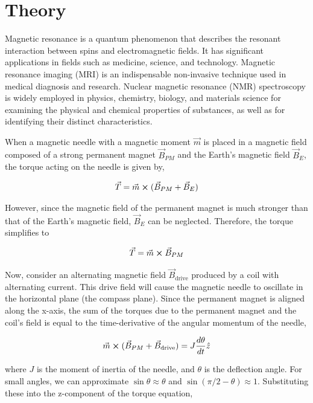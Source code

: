 \section{Theory}

Magnetic resonance is a quantum phenomenon that describes the resonant interaction between spins and electromagnetic fields. It has significant applications in fields such as medicine, science, and technology. Magnetic resonance imaging (MRI) is an indispensable non-invasive technique used in medical diagnosis and research. Nuclear magnetic resonance (NMR) spectroscopy is widely employed in physics, chemistry, biology, and materials science for examining the physical and chemical properties of substances, as well as for identifying their distinct characteristics.

When a magnetic needle with a magnetic moment
$\vec{m}$ is placed in a magnetic field composed of a strong permanent magnet $\vec{B}_{PM}$ and the Earth's magnetic
field $\vec{B}_E$, the torque acting on the needle is given by,

\begin{align}
    \vec{T} = \Vec{m} \cross (\vec{B}_{PM}+\vec{B}_E)
\end{align}

However, since the magnetic field of the permanent magnet is much stronger than that of the Earth's magnetic field, $\vec{B}_E$ can be neglected. Therefore, the torque simplifies to

\begin{align}
    \vec{T} = \Vec{m} \cross \vec{B}_{PM}
\end{align}

Now, consider an alternating magnetic field $\vec{B}_\text{drive}$ produced by a coil with alternating current. This drive field will cause the magnetic needle to oscillate in the horizontal plane (the compass plane). Since the permanent magnet is aligned along the x-axis, the sum of the torques due to the permanent magnet and the coil's field is equal to the time-derivative of the angular momentum of the needle,

\begin{align}
    \Vec{m} \cross (\vec{B}_{PM} +\vec{B}_\text{drive}) = J\frac{d\theta}{dt}\hat{z} 
\end{align}

where $J$ is the moment of inertia of the needle, and $\theta$ is the deflection angle.
For small angles, we can approximate $\sin\theta \approx \theta$ and $\sin(\pi/2 - \theta) \approx 1$. Substituting these into the z-component of the torque equation,

